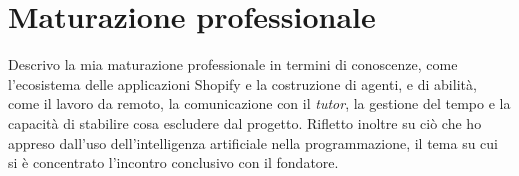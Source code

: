
\section{Maturazione professionale}
\label{sec:maturazione}

Descrivo la mia maturazione professionale in termini di conoscenze, come l’ecosistema delle
applicazioni Shopify e la costruzione di agenti, e di abilità, come il lavoro da remoto, la
comunicazione con il \emph{tutor}, la gestione del tempo e la capacità di stabilire cosa escludere
dal progetto. Rifletto inoltre su ciò che ho appreso dall’uso dell’intelligenza artificiale nella
programmazione, il tema su cui si è concentrato l’incontro conclusivo con il fondatore.
